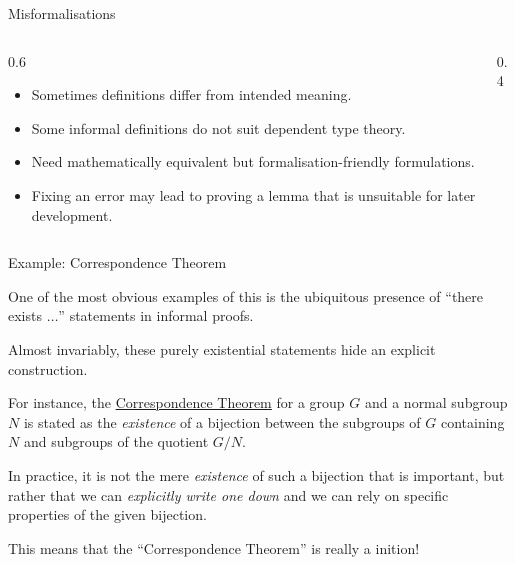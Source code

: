 \documentclass{beamer}
\newcommand{\cverb}[1]{{\color{purple}{\texttt{#1}}}}
\begin{document}
\begin{frame}{Misformalisations}
\begin{columns}[T,totalwidth=\textwidth]
  \begin{column}{0.6\textwidth}
\begin{itemize}
  \item Sometimes definitions differ from intended meaning.
  \medskip
  \item Some informal definitions do not suit dependent type theory.
  \medskip
  \item Need mathematically equivalent but formalisation-friendly formulations.
  \medskip
  \item Fixing an error may lead to proving a lemma that is unsuitable for later development.
\end{itemize}
  \end{column}
  \begin{column}{0.4\textwidth}
  \end{column}
\end{columns}
\end{frame}

\begin{frame}{Example: Correspondence Theorem}

One of the most obvious examples of this is the ubiquitous presence of ``there exists $\ldots$'' statements in informal proofs.

\bigskip

Almost invariably, these purely existential statements hide an explicit construction.

\bigskip

For instance, the \href{https://en.wikipedia.org/wiki/Correspondence_theorem}{Correspondence Theorem} for a group $G$ and a normal subgroup $N$ is stated as the \emph{existence} of a bijection between the subgroups of $G$ containing $N$ and subgroups of the quotient $G / N$.

\bigskip

In practice, it is not the mere \emph{existence} of such a bijection that is important, but rather that we can \emph{explicitly write one down} and we can rely on specific properties of the given bijection.

\bigskip

This means that the ``Correspondence Theorem'' is really a \cverb{def}inition!
\end{frame}
\end{document}
